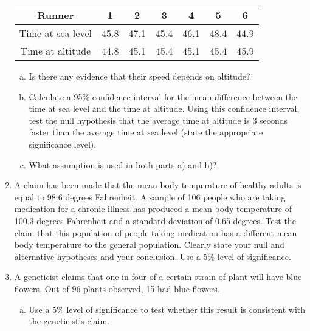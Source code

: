 \documentclass[]{article}
\begin{document}
\begin{enumerate}
\begin{center}
\begin{tabular}{|c|c|c|c|c|c|c|} \hline
Runner & 	1&	2 & 	3	& 4	& 5&  	6\\ \hline
Time at sea level&	45.8&	47.1&	45.4&	46.1 & 	48.4& 	44.9\\ \hline
Time at altitude&	44.8&	45.1&	45.4&	45.1 &	45.4& 	45.9\\ \hline
\end{tabular}
\end{center}
\begin{enumerate}[(a)]
    \item Is there any evidence that their speed depends on altitude? 
\item Calculate a 95\% confidence interval for the mean difference between the time at sea level and the time at altitude. Using this confidence interval, test the null hypothesis that the average time at altitude is 3 seconds faster than the average time at sea level (state the appropriate significance level).
\item What assumption is used in both parts a) and b)? 
\end{enumerate}
\item  A claim has been made that the mean body temperature of healthy adults is equal to 98.6 degrees Fahrenheit. A sample of 106 people who are taking medication for a chronic illness has produced a mean body temperature of 100.3 degrees Fahrenheit and a standard deviation of 0.65 degrees. Test the claim that this population of people taking medication has a different mean body temperature to the general population.  Clearly state your null and alternative hypotheses and your conclusion. Use a 5\% level of significance.
    \item  A geneticist claims that one in four of a certain strain of plant will have
blue flowers. Out of 96 plants observed, 15 had blue flowers.
\begin{enumerate}[(a)]
\item  Use a 5\% level of significance to test whether this result is consistent
with the geneticist’s claim. 
\end{enumerate}


\end{enumerate}
\end{document}
